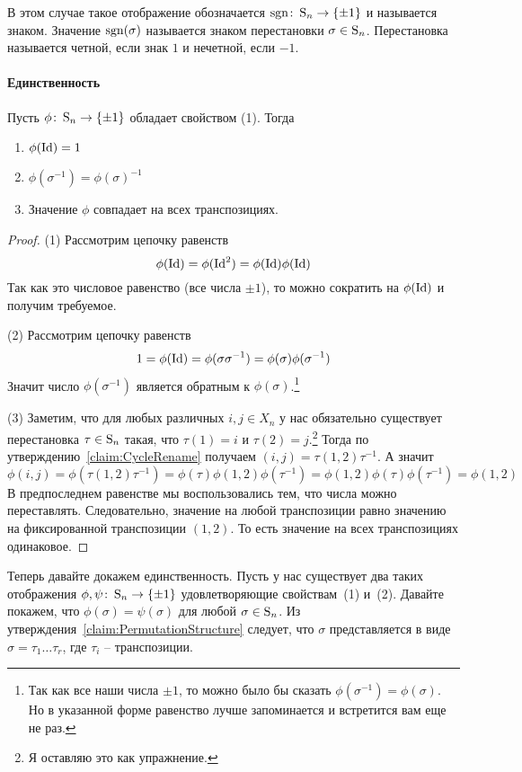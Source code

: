 В этом случае такое отображение обозначается $\operatorname{sgn}\colon \operatorname{S}_{n}\to \{\pm1\}$ и называется знаком. Значение $\operatorname{sgn}(\sigma)$ называется знаком перестановки $\sigma\in\operatorname{S}_{n}$. Перестановка называется четной, если знак $1$ и нечетной, если $-1$.


\paragraph{Единственность}

\begin{claim*}
Пусть $\phi\colon \operatorname{S}_{n}\to \{\pm1\}$ обладает свойством (1). Тогда
\begin{enumerate}
\item $\phi(\operatorname{Id}) = 1$
\item $\phi(\sigma^{-1}) = \phi(\sigma)^{-1}$
\item Значение $\phi$ совпадает на всех транспозициях.
\end{enumerate}
\end{claim*}
\begin{proof}
(1) Рассмотрим цепочку равенств
\[
\phi(\operatorname{Id}) = \phi(\operatorname{Id}^2) = \phi(\operatorname{Id})\phi(\operatorname{Id})
\]
Так как это числовое равенство (все числа $\pm 1$), то можно сократить на $\phi(\operatorname{Id})$ и получим требуемое.


(2) Рассмотрим цепочку равенств
\[
1 = \phi(\operatorname{Id}) = \phi(\sigma \sigma^{-1}) = \phi(\sigma)\phi(\sigma^{-1})
\]
Значит число $\phi(\sigma^{-1})$ является обратным к $\phi(\sigma)$.\footnote{Так как все наши числа $\pm 1$, то можно было бы сказать $\phi(\sigma^{-1}) = \phi(\sigma)$. Но в указанной форме равенство лучше запоминается и встретится вам еще не раз.}

(3) Заметим, что для любых различных $i, j\in X_n$ у нас обязательно существует перестановка $\tau\in\operatorname{S}_{n}$ такая, что $\tau(1) = i$ и $\tau(2) = j$.\footnote{Я оставляю это как упражнение.} Тогда по утверждению~\ref{claim:CycleRename} получаем $(i,j) = \tau (1,2)\tau^{-1}$. А значит
\[
\phi(i,j) = \phi(\tau (1,2) \tau^{-1}) = \phi(\tau)\phi(1,2)\phi(\tau^{-1}) = \phi(1,2)\phi(\tau)\phi(\tau^{-1}) = \phi(1,2)
\]
В предпоследнем равенстве мы воспользовались тем, что числа можно переставлять. Следовательно, значение на любой транспозиции равно значению на фиксированной транспозиции $(1,2)$. То есть значение на всех транспозициях одинаковое.
\end{proof}

Теперь давайте докажем единственность. Пусть у нас существует два таких отображения $\phi, \psi\colon \operatorname{S}_{n}\to \{\pm 1\}$ удовлетворяющие свойствам~(1) и~(2). Давайте покажем, что $\phi(\sigma) = \psi(\sigma)$ для любой $\sigma\in\operatorname{S}_{n}$. Из утверждения~\ref{claim:PermutationStructure}  следует, что $\sigma$ представляется в виде $\sigma = \tau_1\ldots\tau_r$, где $\tau_i$ -- транспозиции. 

